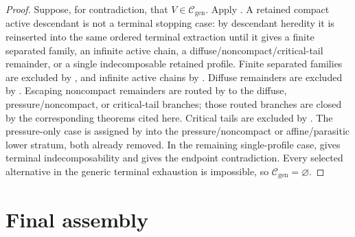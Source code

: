 \documentclass[11pt]{amsart}
\numberwithin{equation}{section}
\theoremstyle{plain}
\theoremstyle{definition}
\theoremstyle{remark}
\newcommand{\Cgen}{\mathcal C_{\mathrm{gen}}}
\begin{document}
\begin{proof}
Suppose, for contradiction, that \(V\in\Cgen\).  Apply
.  A retained compact active descendant is
not a terminal stopping case: by descendant heredity it is reinserted into the
same ordered terminal extraction until it gives a finite separated family, an
infinite active chain, a diffuse/noncompact/critical-tail remainder, or a single
indecomposable retained profile.  Finite separated families are excluded by
, and infinite active chains by
.  Diffuse remainders are excluded by
.  Escaping
noncompact remainders are routed by
to the diffuse, pressure/noncompact, or critical-tail branches; those routed
branches are closed by the corresponding theorems cited here.  Critical
tails are excluded by
.
The pressure-only case is assigned by
 into the pressure/noncompact or
affine/parasitic lower stratum, both already removed.  In the remaining
single-profile case,  gives terminal
indecomposability and  gives the endpoint
contradiction.  Every selected alternative in the generic terminal exhaustion
is impossible, so \(\Cgen=\varnothing\).
\end{proof}

\section{Final assembly}
\label{sec:final-assembly}
\end{document}
